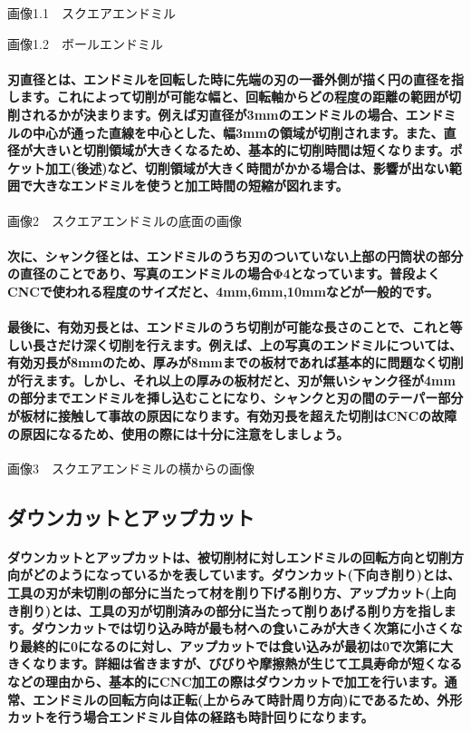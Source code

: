 \documentclass[b5paper, 9pt, twocolumn, titlepage,openany]{jsbook}%
\begin{document}
画像1.1　スクエアエンドミル

画像1.2　ボールエンドミル

\paragraph{刃直径とは、エンドミルを回転した時に先端の刃の一番外側が描く円の直径を指します。これによって切削が可能な幅と、回転軸からどの程度の距離の範囲が切削されるかが決まります。例えば刃直径が3mmのエンドミルの場合、エンドミルの中心が通った直線を中心とした、幅3mmの領域が切削されます。また、直径が大きいと切削領域が大きくなるため、基本的に切削時間は短くなります。ポケット加工(後述)など、切削領域が大きく時間がかかる場合は、影響が出ない範囲で大きなエンドミルを使うと加工時間の短縮が図れます。}

画像2　スクエアエンドミルの底面の画像

\paragraph{次に、シャンク径とは、エンドミルのうち刃のついていない上部の円筒状の部分の直径のことであり、写真のエンドミルの場合Φ4となっています。普段よくCNCで使われる程度のサイズだと、4mm,6mm,10mmなどが一般的です。}
\paragraph{最後に、有効刃長とは、エンドミルのうち切削が可能な長さのことで、これと等しい長さだけ深く切削を行えます。例えば、上の写真のエンドミルについては、有効刃長が8mmのため、厚みが8mmまでの板材であれば基本的に問題なく切削が行えます。しかし、それ以上の厚みの板材だと、刃が無いシャンク径が4mmの部分までエンドミルを挿し込むことになり、シャンクと刃の間のテーパー部分が板材に接触して事故の原因になります。有効刃長を超えた切削はCNCの故障の原因になるため、使用の際には十分に注意をしましょう。}

画像3　スクエアエンドミルの横からの画像

\subsection{ダウンカットとアップカット}

\paragraph{ダウンカットとアップカットは、被切削材に対しエンドミルの回転方向と切削方向がどのようになっているかを表しています。ダウンカット(下向き削り)とは、工具の刃が未切削の部分に当たって材を削り下げる削り方、アップカット(上向き削り)とは、工具の刃が切削済みの部分に当たって削りあげる削り方を指します。ダウンカットでは切り込み時が最も材への食いこみが大きく次第に小さくなり最終的に0になるのに対し、アップカットでは食い込みが最初は0で次第に大きくなります。詳細は省きますが、びびりや摩擦熱が生じて工具寿命が短くなるなどの理由から、基本的にCNC加工の際はダウンカットで加工を行います。通常、エンドミルの回転方向は正転(上からみて時計周り方向)にであるため、外形カットを行う場合エンドミル自体の経路も時計回りになります。}
\end{document}
